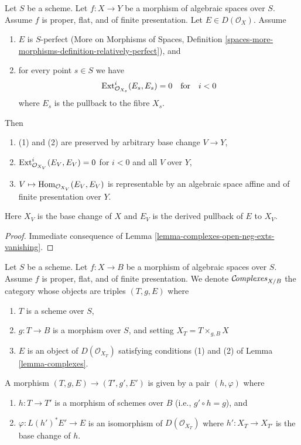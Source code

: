 \begin{lemma}
\label{lemma-complexes}
Let $S$ be a scheme. Let $f : X \to Y$ be a morphism of algebraic
spaces over $S$. Assume $f$ is proper, flat, and of finite presentation.
Let $E \in D(\mathcal{O}_X)$.
Assume
\begin{enumerate}
\item $E$ is $S$-perfect (More on Morphisms of Spaces, Definition
\ref{spaces-more-morphisms-definition-relatively-perfect}), and
\item for every point $s \in S$ we have
$$
\mathop{\mathrm{Ext}}\nolimits^i_{\mathcal{O}_{X_s}}(E_s, E_s) = 0
\quad\text{for}\quad i < 0
$$
where $E_s$ is the pullback to the fibre $X_s$.
\end{enumerate}
Then
\begin{enumerate}
\item[(a)] (1) and (2) are preserved by arbitrary base change $V \to Y$,
\item[(b)] $\mathop{\mathrm{Ext}}\nolimits^i_{\mathcal{O}_{X_V}}(E_V, E_V) = 0$ for $i < 0$
and all $V$ over $Y$,
\item[(c)] $V \mapsto \mathop{\mathrm{Hom}}\nolimits_{\mathcal{O}_{X_V}}(E_V, E_V)$ is representable
by an algebraic space affine and of finite presentation over $Y$.
\end{enumerate}
Here $X_V$ is the base change of $X$ and $E_V$ is the derived pullback
of $E$ to $X_V$.
\end{lemma}

\begin{proof}
Immediate consequence of Lemma \ref{lemma-complexes-open-neg-exts-vanishing}.
\end{proof}

\begin{situation}
\label{situation-complexes}
Let $S$ be a scheme. Let $f : X \to B$ be a morphism of algebraic spaces
over $S$. Assume $f$ is proper, flat, and of finite presentation.
We denote $\mathcal{C}\!\mathit{omplexes}_{X/B}$ the category whose objects are
triples $(T, g, E)$ where
\begin{enumerate}
\item $T$ is a scheme over $S$,
\item $g : T \to B$ is a morphism over $S$, and setting
$X_T = T \times_{g, B} X$
\item $E$ is an object of $D(\mathcal{O}_{X_T})$ satisfying
conditions (1) and (2) of Lemma \ref{lemma-complexes}.
\end{enumerate}
A morphism $(T, g, E) \to (T', g', E')$
is given by a pair $(h, \varphi)$ where
\begin{enumerate}
\item $h : T \to T'$ is a morphism of schemes over $B$
(i.e., $g' \circ h = g$), and
\item $\varphi : L(h')^*E' \to E$ is an
isomorphism of $D(\mathcal{O}_{X_T})$ where $h' : X_T \to X_{T'}$
is the base change of $h$.
\end{enumerate}
\end{situation}

